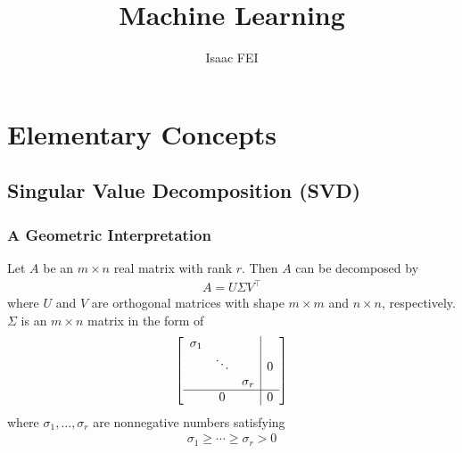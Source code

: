 \documentclass[color=blue, thmcnt=section, 12pt]{elegantbook}
\title{Machine Learning}
\author{Isaac FEI}
\begin{document}
\maketitle

\frontmatter
\tableofcontents
\mainmatter





\part{Elementary Concepts}








\chapter{Singular Value Decomposition (SVD)}


\section{A Geometric Interpretation}

\begin{theorem}
    Let $A$ be an $m \times n$ real matrix with rank $r$. Then $A$ can be decomposed by 
    \begin{align*}
        A = U \Sigma V^\top
    \end{align*}
    where $U$ and $V$ are orthogonal matrices with shape $m \times m$ and $n \times n$, respectively. $\Sigma$ is an $m \times n$ matrix in the form of
    \begin{align*}
        \left[ \begin{array}{ccc|c}
            \sigma_1 &  & & \\ 
            & \ddots & & 0 \\ 
            & & \sigma_r & \\ 
            \hline
            & 0 & & 0
        \end{array} \right]
    \end{align*}
    where $\sigma_1, \ldots, \sigma_r$ are nonnegative numbers satisfying
    \begin{align*}
        \sigma_1 \geq \cdots \geq \sigma_r > 0
    \end{align*}
\end{theorem}
\end{document}
